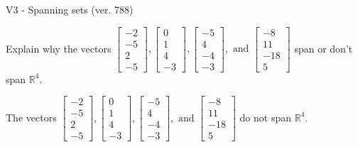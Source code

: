 \begin{exercise}
  \begin{exerciseTitle}V3 - Spanning sets (ver. 788)\end{exerciseTitle}
  \begin{exerciseStatement}
    Explain why the vectors \(\left[\begin{array}{r}
-2 \\
-5 \\
2 \\
-5
\end{array}\right] , \left[\begin{array}{r}
0 \\
1 \\
4 \\
-3
\end{array}\right] , \left[\begin{array}{r}
-5 \\
4 \\
-4 \\
-3
\end{array}\right] , \text{ and } \left[\begin{array}{r}
-8 \\
11 \\
-18 \\
5
\end{array}\right]\) span or don't span \(\mathbb{R}^4\). 
	


  \end{exerciseStatement}
  \begin{exerciseAnswer}
   The vectors \(\left[\begin{array}{r}
-2 \\
-5 \\
2 \\
-5
\end{array}\right] , \left[\begin{array}{r}
0 \\
1 \\
4 \\
-3
\end{array}\right] , \left[\begin{array}{r}
-5 \\
4 \\
-4 \\
-3
\end{array}\right] , \text{ and } \left[\begin{array}{r}
-8 \\
11 \\
-18 \\
5
\end{array}\right]\) 
  	 do not  
	span \(\mathbb{R}^4\).
  


  \end{exerciseAnswer}
\end{exercise}